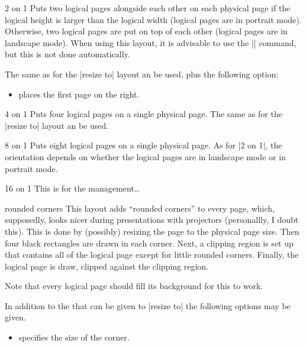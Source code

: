 \begin{pgflayout}{2 on 1}
  Puts two logical pages alongside each other on each physical page if
  the logical height is larger than the logical width (logical pages
  are in portrait mode). Otherwise, two
  logical pages are put on top of each other (logical pages are in
  landscape mode). When using this layout, it is advisable to use the
  |\nofiles| command, but this is not done automatically.

  The same  as for the |resize to| layout an be used,
  plus the following option:
  \begin{itemize}
  \item
    places the first page on the right.
  \end{itemize}
\end{pgflayout}


\begin{pgflayout}{4 on 1}
  Puts four logical pages on a single physical page.
  The same  as for the |resize to| layout an be used.
\end{pgflayout}

\begin{pgflayout}{8 on 1}
  Puts eight logical pages on a single physical page. As for |2 on 1|,
  the orientation depends on whether the logical pages are in
  landscape mode or in portrait mode.
\end{pgflayout}

\begin{pgflayout}{16 on 1}
  This is for the management\dots
\end{pgflayout}

\begin{pgflayout}{rounded corners}
  \label{layout-rounded-corners}
  This layout adds ``rounded corners'' to every page, which,
  supposedly, looks nicer during presentations with projectors
  (personallly, I doubt this). This is done by (possibly) resizing the
  page to the physical page size. Then four black rectangles are
  drawn in each corner. Next, a clipping region is set up that
  contains all of the logical page except for little rounded
  corners. Finally, the logical page is draw, clipped against the
  clipping region. 

  Note that every logical page should fill its background for this to
  work.

  In addition to the  that can be given to |resize to|
  the following options may be given.
  \begin{itemize}
    \item {} specifies the size of
    the corner.
  \end{itemize}

\end{pgflayout}


